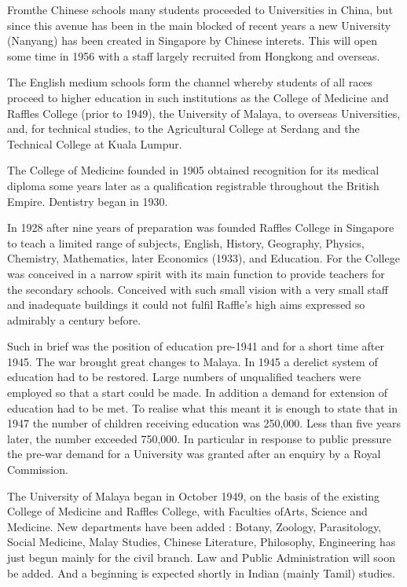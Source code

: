 From\pageoriginale the Chinese schools many students proceeded to Universities in China, but since this avenue has been in the main blocked of recent years a new University (Nanyang) has been created in Singapore by Chinese interets. This will open some time in 1956 with a staff largely recruited from Hongkong and overseas.

The English medium schools form the channel whereby students of all races proceed to higher education in such institutions as the College of Medicine and Raffles College (prior to 1949), the University of Malaya, to overseas Universities, and, for technical studies, to the Agricultural College at Serdang and the Technical College at Kuala Lumpur.

The College of Medicine founded in 1905 obtained recognition for its medical diploma some years later as a qualification registrable throughout the British Empire. Dentistry began in 1930.

In 1928 after nine years of preparation was founded Raffles College in Singapore to teach a limited range of subjects, English, History, Geography, Physics, Chemistry, Mathematics, later Economics (1933), and Education. For the College was conceived in a narrow spirit with its main function to provide teachers for the secondary schools. Conceived with such small vision with a very small staff and inadequate buildings it could not fulfil Raffle's high aims expressed so admirably a century before.

Such in brief was the position of education pre-1941 and for a short time after 1945. The war brought great changes to Malaya. In 1945 a derelict system of education had to be restored. Large numbers of unqualified teachers were employed so that a start could be made. In addition a demand for extension of education had to be met. To realise what this meant it is enough to state that in 1947 the number of children receiving education was 250,000. Less than five years later, the number exceeded 750,000. In particular in response to public pressure the pre-war demand for a University was granted after an enquiry by a Royal Commission.

The University of Malaya began in October 1949, on the basis of the existing College of Medicine and Raffles College, with Faculties of\pageoriginale Arts, Science and Medicine. New departments have been added : Botany, Zoology, Parasitology, Social Medicine, Malay Studies, Chinese Literature, Philosophy, Engineering has just begun mainly for the civil branch. Law and Public Administration will soon be added. And a beginning is expected shortly in Indian (mainly Tamil) studies.

